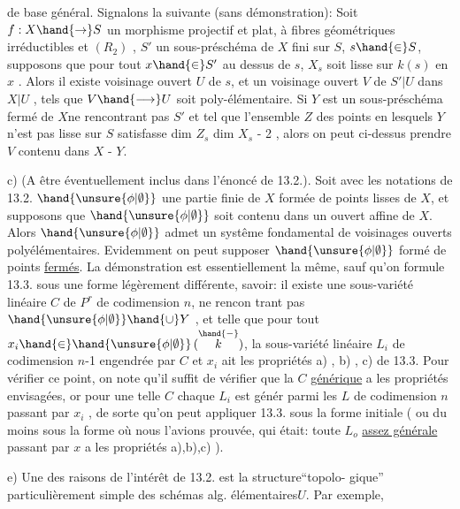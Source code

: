 
de base général. Signalons la suivante (sans démonstration): Soit $f:X\hand{\to} S$
un morphisme projectif et plat,  à fibres géométriques
 irréductibles et $(R_2)$ , $S'$ un sous-préschéma de $X$ fini sur $S$,
$s\hand{\in} S$, supposons que pour tout $x\hand{\in} S'$ au dessus de $s$, $X_s$ soit lisse sur
$k(s)$ en $x$ . Alors il existe  voisinage ouvert $U$ de $s$, et un voisinage
ouvert $V$ de $S'|U$ dans $X|U$ , tels que $V\hand{\longrightarrow} U$ soit poly-élémentaire.
Si $Y$ est un sous-préschéma fermé de $X$ne rencontrant pas $S'$ et tel que l'ensemble $Z$ des points
en lesquels $Y$ n'est pas lisse sur $S$   satisfasse
dim $Z_s$ \hand{$\leq$} dim $X_s$ - 2 , alors on peut ci-dessus prendre $V$ contenu dans
$X$ - $Y$.

c) (A être éventuellement inclus dans l'énoncé de 13.2.). Soit
avec les notations de 13.2. $\hand{\unsure{\phi|\emptyset}}$ une partie finie de $X$ formée de points
lisses de $X$, et supposons que $\hand{\unsure{\phi|\emptyset}}$ soit contenu dans un  ouvert affine
de $X$. Alors $\hand{\unsure{\phi|\emptyset}}$ admet un systême fondamental de voisinages ouverts
polyélémentaires. Evidemment on peut supposer $\hand{\unsure{\phi|\emptyset}}$ formé de points \uline{fermés}. La démonstration est essentiellement la même, sauf
qu'on formule 13.3. sous une forme légèrement différente, savoir: il
existe une sous-variété linéaire $C$ de $P^r$ de codimension $n$, ne rencon%
trant pas $\hand{\unsure{\phi|\emptyset}}\hand{\cup} Y$ , et telle que pour tout $x_i\hand{\in}\hand{\unsure{\phi|\emptyset}}$$(\overset{\hand{-}}{k})$, la sous-variété
linéaire $L_i$ de codimension $n$-1 engendrée par $C$ et $x_i$ ait les propriétés
a) , b) , c) de 13.3. Pour vérifier ce point, on note qu'il suffit de
vérifier que la $C$ \uline{générique} a les propriétés envisagées, or pour une telle $C$ 
 chaque $L_i$ est génér parmi les $L$ de codimension $n$ passant
par $x_i$ , de sorte qu'on peut appliquer 13.3. sous la forme initiale
( ou du moins sous la forme où nous l'avions prouvée, qui était: toute
$L_o$ \uline{assez générale} passant par $x$ a les propriétés a),b),c) ).

e) Une des raisons de l'intérêt de 13.2. est la structure``topolo-%
gique'' particulièrement simple des  schémas alg. élémentaires$U$. Par exemple,

